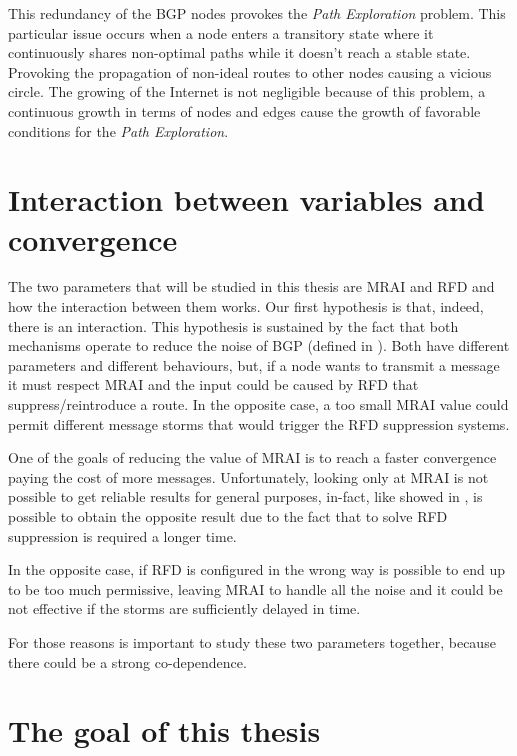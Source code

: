 This redundancy of the \ac{BGP} nodes provokes the \textit{Path Exploration}
problem.
This particular issue occurs when a node enters a transitory state where it
continuously shares non-optimal paths while it doesn't reach a stable state.
Provoking the propagation of non-ideal routes to other nodes causing a vicious
circle.
The growing of the Internet is not negligible because of this problem, a continuous
growth in terms of nodes and edges cause the growth of favorable conditions for
the \textit{Path Exploration}.

\section{Interaction between variables and convergence}
\label{sec:bgp_correlations}

The two parameters that will be studied in this thesis are \ac{MRAI} and \ac{RFD}
and how the interaction between them works.
Our first hypothesis is that, indeed, there is an interaction.
This hypothesis is sustained by the fact that both mechanisms operate to
reduce the noise of \ac{BGP} (defined in ).
Both have different parameters and different behaviours,
but, if a node wants to transmit a message it must respect \ac{MRAI} and the input
could be caused by \ac{RFD} that suppress/reintroduce a route.
In the opposite case, a too small \ac{MRAI} value could permit different message
storms that would trigger the \ac{RFD} suppression systems.

One of the goals of reducing the value of \ac{MRAI} is to reach a faster convergence
paying the cost of more messages.
Unfortunately, looking only at \ac{MRAI} is not possible to get reliable results
for general purposes, in-fact, like showed in , is possible
to obtain the opposite result due to the fact that to solve \ac{RFD} suppression
is required a longer time.

In the opposite case, if \ac{RFD} is configured in the wrong way is possible to
end up to be too much permissive, leaving \ac{MRAI} to handle all the noise and
it could be not effective if the storms are sufficiently delayed in time.

For those reasons is important to study these two parameters together, because
there could be a strong co-dependence.

\section{The goal of this thesis}
\label{sec:thesis_goal}

